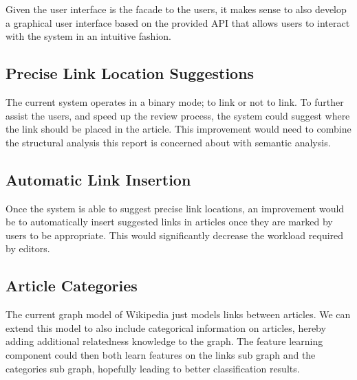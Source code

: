 Given the user interface is the facade to the users, it makes sense to also develop a graphical user interface based on the provided API that allows users to interact with the system in an intuitive fashion.

\subsection{Precise Link Location Suggestions}
The current system operates in a binary mode; to link or not to link. To further assist the users, and speed up the review process, the system could suggest where the link should be placed in the article. This improvement would need to combine the structural analysis this report is concerned about with semantic analysis.

\subsection{Automatic Link Insertion}
Once the system is able to suggest precise link locations, an improvement would be to automatically insert suggested links in articles once they are marked by users to be appropriate. This would significantly decrease the workload required by editors.

\subsection{Article Categories}
The current graph model of Wikipedia just models links between articles. We can extend this model to also include categorical information on articles, hereby adding additional relatedness knowledge to the graph. The feature learning component could then both learn features on the links sub graph and the categories sub graph, hopefully leading to better classification results.